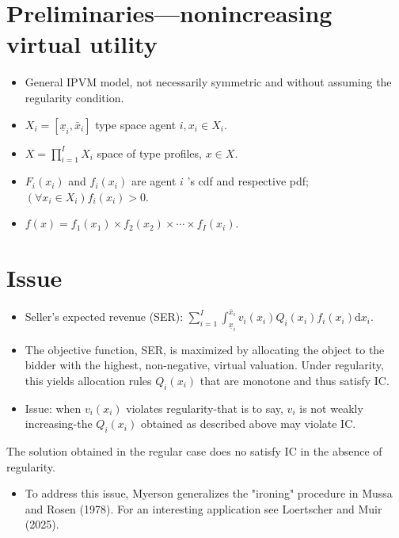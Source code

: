 \documentclass[10pt]{article}
\begin{document}
\captionsetup{singlelinecheck=false}
\section*{Preliminaries—nonincreasing virtual utility}
\begin{itemize}
  \item General IPVM model, not necessarily symmetric and without assuming the regularity condition.
  \item $X_{i}=\left[\underline{x}_{i}, \bar{x}_{i}\right]$ type space agent $i, x_{i} \in X_{i}$.
  \item $X=\prod_{i=1}^{I} X_{i}$ space of type profiles, $x \in X$.
  \item $F_{i}\left(x_{i}\right)$ and $f_{i}\left(x_{i}\right)$ are agent $i$ 's cdf and respective pdf; $\left(\forall x_{i} \in X_{i}\right) f_{i}\left(x_{i}\right)>0$.
  \item $f(x)=f_{1}\left(x_{1}\right) \times f_{2}\left(x_{2}\right) \times \cdots \times f_{I}\left(x_{i}\right)$.
\end{itemize}

\section*{Issue}
\begin{itemize}
  \item Seller's expected revenue (SER): $\sum_{i=1}^{I} \int_{\underline{x}_{i}}^{\bar{x}_{i}} v_{i}\left(x_{i}\right) Q_{i}\left(x_{i}\right) f_{i}\left(x_{i}\right) \mathrm{d} x_{i}$.
  \item The objective function, SER, is maximized by allocating the object to the bidder with the highest, non-negative, virtual valuation. Under regularity, this yields allocation rules $Q_{i}\left(x_{i}\right)$ that are monotone and thus satisfy IC.
  \item Issue: when $v_{i}\left(x_{i}\right)$ violates regularity-that is to say, $v_{i}$ is not weakly increasing-the $Q_{i}\left(x_{i}\right)$ obtained as described above may violate IC.
\end{itemize}

The solution obtained in the regular case does no satisfy IC in the absence of regularity.

\begin{itemize}
  \item To address this issue, Myerson generalizes the "ironing" procedure in Mussa and Rosen (1978). For an interesting application see Loertscher and Muir (2025).
\end{itemize}
\end{document}
